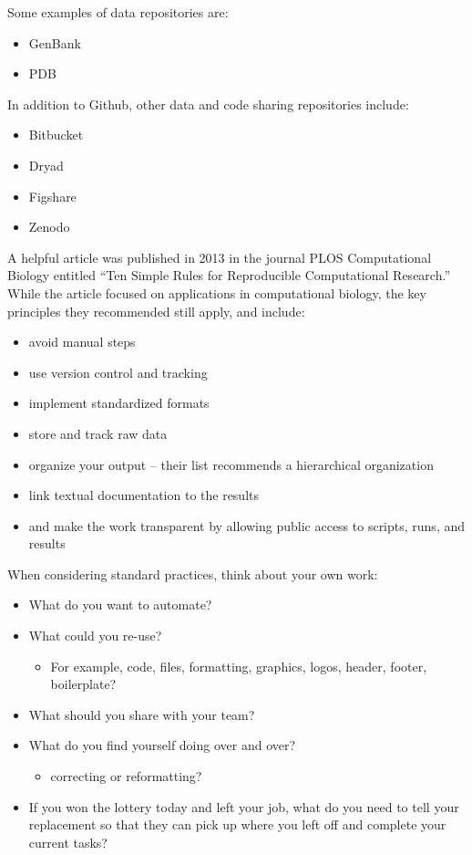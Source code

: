 \documentclass[]{book}
\providecommand{\tightlist}{%
  \setlength{\itemsep}{0pt}\setlength{\parskip}{0pt}}
\theoremstyle{definition}
\theoremstyle{definition}
\theoremstyle{definition}
\theoremstyle{remark}
\begin{document}
Some examples of data repositories are:

\begin{itemize}
\tightlist
\item
  GenBank
\item
  PDB
\end{itemize}

In addition to Github, other data and code sharing repositories include:

\begin{itemize}
\tightlist
\item
  Bitbucket
\item
  Dryad
\item
  Figshare
\item
  Zenodo
\end{itemize}

A helpful article was published in 2013 in the journal PLOS
Computational Biology entitled ``Ten Simple Rules for Reproducible
Computational Research.'' While the article focused on applications in
computational biology, the key principles they recommended still apply,
and include:

\begin{itemize}
\tightlist
\item
  avoid manual steps
\item
  use version control and tracking
\item
  implement standardized formats
\item
  store and track raw data
\item
  organize your output -- their list recommends a hierarchical
  organization
\item
  link textual documentation to the results
\item
  and make the work transparent by allowing public access to scripts,
  runs, and results
\end{itemize}

When considering standard practices, think about your own work:

\begin{itemize}
\tightlist
\item
  What do you want to automate?
\item
  What could you re-use?

  \begin{itemize}
  \tightlist
  \item
    For example, code, files, formatting, graphics, logos, header,
    footer, boilerplate?
  \end{itemize}
\item
  What should you share with your team?
\item
  What do you find yourself doing over and over?

  \begin{itemize}
  \tightlist
  \item
    correcting or reformatting?
  \end{itemize}
\item
  If you won the lottery today and left your job, what do you need to
  tell your replacement so that they can pick up where you left off and
  complete your current tasks?
\end{itemize}
\end{document}
